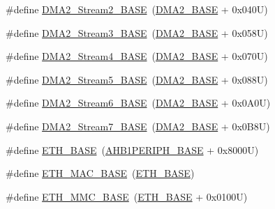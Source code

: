\begin{DoxyCompactItemize}
\item 
\#define \hyperlink{group___peripheral__memory__map_gaed33a06f08188466f2ede06160984e9a}{D\+M\+A2\+\_\+\+Stream2\+\_\+\+B\+A\+SE}~(\hyperlink{group___peripheral__memory__map_gab72a9ae145053ee13d1d491fb5c1df64}{D\+M\+A2\+\_\+\+B\+A\+SE} + 0x040\+U)
\item 
\#define \hyperlink{group___peripheral__memory__map_gaf3a9480e08c6ae94f4482e0cdaebdd17}{D\+M\+A2\+\_\+\+Stream3\+\_\+\+B\+A\+SE}~(\hyperlink{group___peripheral__memory__map_gab72a9ae145053ee13d1d491fb5c1df64}{D\+M\+A2\+\_\+\+B\+A\+SE} + 0x058\+U)
\item 
\#define \hyperlink{group___peripheral__memory__map_gad1e67740e6301233473f64638145dd1f}{D\+M\+A2\+\_\+\+Stream4\+\_\+\+B\+A\+SE}~(\hyperlink{group___peripheral__memory__map_gab72a9ae145053ee13d1d491fb5c1df64}{D\+M\+A2\+\_\+\+B\+A\+SE} + 0x070\+U)
\item 
\#define \hyperlink{group___peripheral__memory__map_gaed1460fdc407b6decfbffccb0260d0af}{D\+M\+A2\+\_\+\+Stream5\+\_\+\+B\+A\+SE}~(\hyperlink{group___peripheral__memory__map_gab72a9ae145053ee13d1d491fb5c1df64}{D\+M\+A2\+\_\+\+B\+A\+SE} + 0x088\+U)
\item 
\#define \hyperlink{group___peripheral__memory__map_ga5e81174c96fd204fa7c82c815e85c8e6}{D\+M\+A2\+\_\+\+Stream6\+\_\+\+B\+A\+SE}~(\hyperlink{group___peripheral__memory__map_gab72a9ae145053ee13d1d491fb5c1df64}{D\+M\+A2\+\_\+\+B\+A\+SE} + 0x0\+A0\+U)
\item 
\#define \hyperlink{group___peripheral__memory__map_gaa9faa708ad2440d24eb1064cba9bb06d}{D\+M\+A2\+\_\+\+Stream7\+\_\+\+B\+A\+SE}~(\hyperlink{group___peripheral__memory__map_gab72a9ae145053ee13d1d491fb5c1df64}{D\+M\+A2\+\_\+\+B\+A\+SE} + 0x0\+B8\+U)
\item 
\#define \hyperlink{group___peripheral__memory__map_gad965a7b1106ece575ed3da10c45c65cc}{E\+T\+H\+\_\+\+B\+A\+SE}~(\hyperlink{group___peripheral__memory__map_ga811a9a4ca17f0a50354a9169541d56c4}{A\+H\+B1\+P\+E\+R\+I\+P\+H\+\_\+\+B\+A\+SE} + 0x8000\+U)
\item 
\#define \hyperlink{group___peripheral__memory__map_ga3cf7005808feb61bff1fee01e50a711a}{E\+T\+H\+\_\+\+M\+A\+C\+\_\+\+B\+A\+SE}~(\hyperlink{group___peripheral__memory__map_gad965a7b1106ece575ed3da10c45c65cc}{E\+T\+H\+\_\+\+B\+A\+SE})
\item 
\#define \hyperlink{group___peripheral__memory__map_ga4946f2b3b03f7998343ac1778fbcf725}{E\+T\+H\+\_\+\+M\+M\+C\+\_\+\+B\+A\+SE}~(\hyperlink{group___peripheral__memory__map_gad965a7b1106ece575ed3da10c45c65cc}{E\+T\+H\+\_\+\+B\+A\+SE} + 0x0100\+U)

\end{DoxyCompactItemize}
